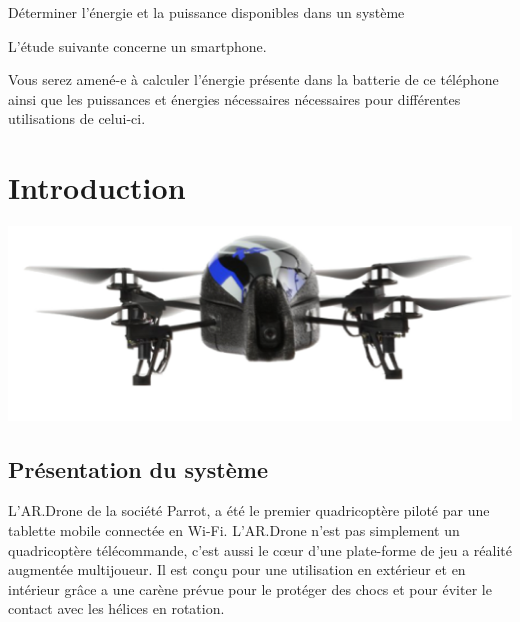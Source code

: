 \documentclass[10pt,fleqn]{article} %
\begin{document}

\begin{obj}
Déterminer l’énergie et la puissance disponibles dans un système

L’étude suivante concerne un smartphone.

Vous serez amené-e à
 calculer l’énergie présente dans la batterie de ce téléphone ainsi que les puissances et énergies nécessaires
 nécessaires pour différentes utilisations de celui-ci.

\end{obj}
\section{Introduction}
\begin{center}
    \includegraphics[height=0.1\textheight]{images/drone.png}
\end{center}


\subsection{Présentation du système}
L'AR.Drone de la société Parrot, a été le premier quadricoptère piloté par une tablette mobile connectée en Wi-Fi. L'AR.Drone n'est pas simplement un quadricoptère télécommande, c'est aussi le cœur d'une plate-forme de jeu a réalité augmentée multijoueur.
Il est conçu pour une utilisation en extérieur et en intérieur grâce a une carène prévue pour le protéger des chocs et pour éviter le contact avec les hélices en rotation.


\end{document}
